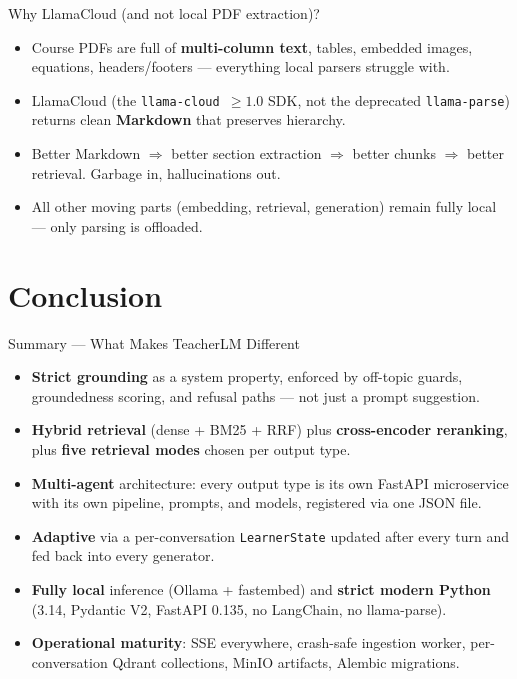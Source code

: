 \documentclass[aspectratio=169, 10pt]{beamer}
\begin{document}
\begin{frame}{Why LlamaCloud (and not local PDF extraction)?}
  \begin{itemize}
    \item Course PDFs are full of \textbf{multi-column text}, tables,
          embedded images, equations, headers/footers --- everything
          local parsers struggle with.
    \item LlamaCloud (the \texttt{llama-cloud $\geq 1.0$} SDK, not the
          deprecated \texttt{llama-parse}) returns clean \textbf{Markdown}
          that preserves hierarchy.
    \item Better Markdown $\Rightarrow$ better section extraction
          $\Rightarrow$ better chunks $\Rightarrow$ better retrieval.
          Garbage in, hallucinations out.
    \item All other moving parts (embedding, retrieval, generation)
          remain fully local --- only parsing is offloaded.
  \end{itemize}
\end{frame}

\section{Conclusion}

\begin{frame}{Summary --- What Makes TeacherLM Different}
  \begin{itemize}
    \item \textbf{Strict grounding} as a system property, enforced by
          off-topic guards, groundedness scoring, and refusal paths ---
          not just a prompt suggestion.
    \item \textbf{Hybrid retrieval} (dense + BM25 + RRF) plus
          \textbf{cross-encoder reranking}, plus \textbf{five retrieval
          modes} chosen per output type.
    \item \textbf{Multi-agent} architecture: every output type is its
          own FastAPI microservice with its own pipeline, prompts, and
          models, registered via one JSON file.
    \item \textbf{Adaptive} via a per-conversation \texttt{LearnerState}
          updated after every turn and fed back into every generator.
    \item \textbf{Fully local} inference (Ollama + fastembed) and
          \textbf{strict modern Python} (3.14, Pydantic V2, FastAPI 0.135,
          no LangChain, no llama-parse).
    \item \textbf{Operational maturity}: SSE everywhere, crash-safe
          ingestion worker, per-conversation Qdrant collections, MinIO
          artifacts, Alembic migrations.
  \end{itemize}
\end{frame}
\end{document}
